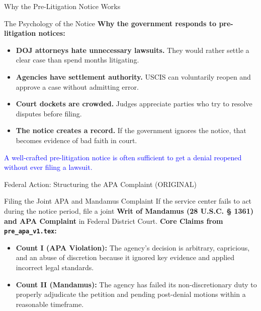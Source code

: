 \documentclass[11pt]{beamer}
\begin{document}
	\begin{frame}{Why the Pre-Litigation Notice Works}
		\scriptsize
		\begin{block}{The Psychology of the Notice}
			\textbf{Why the government responds to pre-litigation notices:}
			\begin{itemize}
				\item \textbf{DOJ attorneys hate unnecessary lawsuits.} They would rather settle a clear case than spend months litigating.
				\item \textbf{Agencies have settlement authority.} USCIS can voluntarily reopen and approve a case without admitting error.
				\item \textbf{Court dockets are crowded.} Judges appreciate parties who try to resolve disputes before filing.
				\item \textbf{The notice creates a record.} If the government ignores the notice, that becomes evidence of bad faith in court.
			\end{itemize}
			\textcolor{blue}{A well-crafted pre-litigation notice is often sufficient to get a denial reopened without ever filing a lawsuit.}
		\end{block}
	\end{frame}
	
	\begin{frame}{Federal Action: Structuring the APA Complaint (ORIGINAL)}
		\scriptsize
		\begin{block}{Filing the Joint APA and Mandamus Complaint}
			If the service center fails to act during the notice period, file a joint \textbf{Writ of Mandamus (28 U.S.C. § 1361) and APA Complaint} in Federal District Court.
			\vspace{0.1cm}
			\textbf{Core Claims from \texttt{pre\_apa\_v1.tex}:}
			\begin{itemize}
				\item \textbf{Count I (APA Violation):} The agency’s decision is arbitrary, capricious, and an abuse of discretion because it ignored key evidence and applied incorrect legal standards.
				\item \textbf{Count II (Mandamus):} The agency has failed its non-discretionary duty to properly adjudicate the petition and pending post-denial motions within a reasonable timeframe.
			\end{itemize}
		\end{block}
	\end{frame}
	
	
\end{document}
